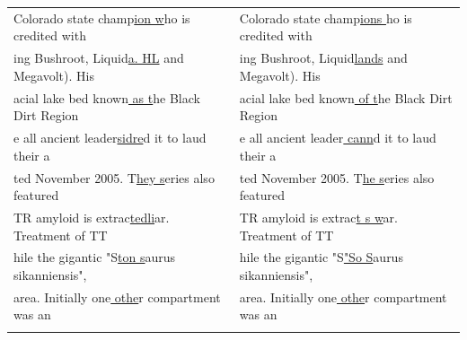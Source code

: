 \documentclass{article}
\newenvironment{bookman}{\scriptsize\fontfamily{bch}\selectfont}{\par}
\begin{document}
\begin{table}[t]
\begin{tabular}{ l  l }
\begin{bookman} Colorado state champ\underline{ion w}ho is credited with  \end{bookman}  & \begin{bookman} Colorado state champ\underline{ions }ho is credited with  \end{bookman}  \\
\begin{bookman} ing Bushroot, Liquid\underline{a. HL} and Megavolt).  His \end{bookman}  & \begin{bookman} ing Bushroot, Liquid\underline{lands} and Megavolt).  His \end{bookman}  \\
\begin{bookman} acial lake bed known\underline{ as t}he Black Dirt Region \end{bookman}  & \begin{bookman} acial lake bed known\underline{ of t}he Black Dirt Region \end{bookman}  \\
\begin{bookman} e all ancient leader\underline{sidre}d it to laud their a \end{bookman}  & \begin{bookman} e all ancient leader\underline{ cann}d it to laud their a \end{bookman}  \\
\begin{bookman} ted November 2005. T\underline{hey s}eries also featured  \end{bookman}  & \begin{bookman} ted November 2005. T\underline{he  s}eries also featured  \end{bookman}  \\
\begin{bookman} TR amyloid is extrac\underline{tedli}ar.  Treatment of TT \end{bookman}  & \begin{bookman} TR amyloid is extrac\underline{t s w}ar.  Treatment of TT \end{bookman}  \\
\begin{bookman} hile the gigantic "S\underline{ton s}aurus sikanniensis", \end{bookman}  & \begin{bookman} hile the gigantic "S\underline{"So S}aurus sikanniensis", \end{bookman}  \\
\begin{bookman}  area. Initially one\underline{ othe}r compartment was an \end{bookman}  & \begin{bookman}  area. Initially one\underline{ othe}r compartment was an \end{bookman}  \\
\noalign{\smallskip}
\hline
\end{tabular}
\label{tab:samples}
\end{table}
\end{document}
